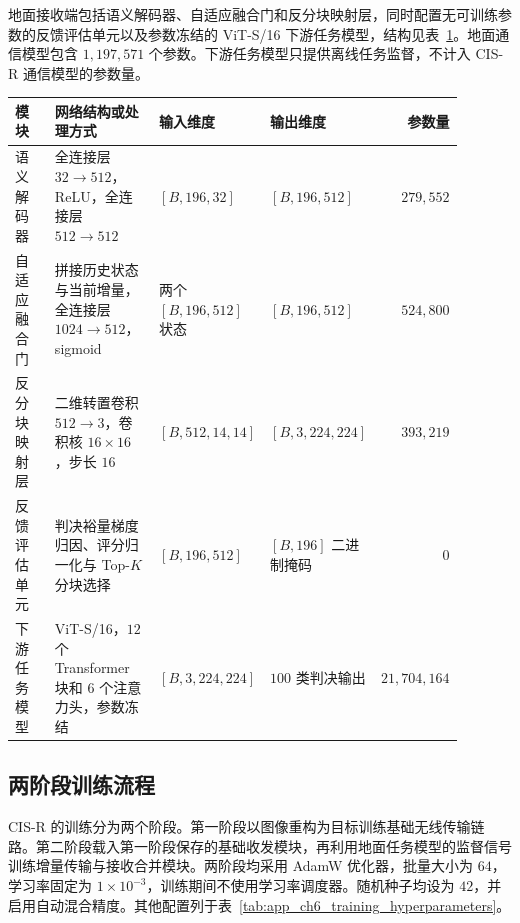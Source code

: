 地面接收端包括语义解码器、自适应融合门和反分块映射层，同时配置无可训练参数的反馈评估单元以及参数冻结的 ViT-S/16 下游任务模型，结构见表~\ref{tab:app_ch6_rx_architecture}。地面通信模型包含 $1{,}197{,}571$ 个参数。下游任务模型只提供离线任务监督，不计入 CIS-R 通信模型的参数量。

\begin{table}[!htp]
    \centering
    \label{tab:app_ch6_rx_architecture}
    \scriptsize
    \setlength{\tabcolsep}{3.0pt}
    \renewcommand{\arraystretch}{1.13}
    \begin{tabular}{@{}p{0.18\linewidth}p{0.35\linewidth}p{0.18\linewidth}p{0.18\linewidth}r@{}}
        \toprule
        模块 & 网络结构或处理方式 & 输入维度 & 输出维度 & 参数量 \\
        \midrule
        语义解码器 & 全连接层 $32\rightarrow512$，ReLU，全连接层 $512\rightarrow512$ & $[B,196,32]$ & $[B,196,512]$ & $279{,}552$ \\
        自适应融合门 & 拼接历史状态与当前增量，全连接层 $1024\rightarrow512$，sigmoid & 两个 $[B,196,512]$ 状态 & $[B,196,512]$ & $524{,}800$ \\
        反分块映射层 & 二维转置卷积 $512\rightarrow3$，卷积核 $16\times16$，步长 $16$ & $[B,512,14,14]$ & $[B,3,224,224]$ & $393{,}219$ \\
        反馈评估单元 & 判决裕量梯度归因、评分归一化与 Top-$K$ 分块选择 & $[B,196,512]$ & $[B,196]$ 二进制掩码 & $0$ \\
        下游任务模型 & ViT-S/16，$12$ 个 Transformer 块和 $6$ 个注意力头，参数冻结 & $[B,3,224,224]$ & $100$ 类判决输出 & $21{,}704{,}164$ \\
        \bottomrule
    \end{tabular}
\end{table}

\subsection{两阶段训练流程}

CIS-R 的训练分为两个阶段。第一阶段以图像重构为目标训练基础无线传输链路。第二阶段载入第一阶段保存的基础收发模块，再利用地面任务模型的监督信号训练增量传输与接收合并模块。两阶段均采用 AdamW 优化器，批量大小为 $64$，学习率固定为 $1\times10^{-3}$，训练期间不使用学习率调度器。随机种子均设为 $42$，并启用自动混合精度。其他配置列于表~\ref{tab:app_ch6_training_hyperparameters}。

